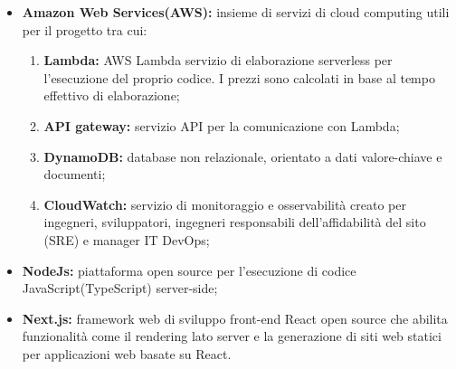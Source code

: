 \begin{itemize}
\item {\bf Amazon Web Services(AWS):} insieme di servizi di cloud computing utili per il progetto tra cui:
\begin{enumerate}
\item {\bf Lambda:} AWS Lambda servizio di elaborazione serverless per l'esecuzione del proprio codice. I prezzi sono calcolati in base al tempo effettivo di elaborazione;
\item {\bf API gateway:} servizio API per la comunicazione con Lambda;
\item {\bf DynamoDB:} database non relazionale, orientato a dati valore-chiave e documenti;
\item {\bf CloudWatch:} servizio di monitoraggio e osservabilità creato per ingegneri, sviluppatori, ingegneri responsabili dell'affidabilità del sito (SRE) e manager IT DevOps;
\end{enumerate}
\item {\bf NodeJs:} piattaforma open source per l'esecuzione di codice JavaScript(TypeScript) server-side;
\item {\bf Next.js:} framework web di sviluppo front-end React open source che abilita funzionalità come il rendering lato server e la generazione di siti web statici per applicazioni web basate su React. 
\end{itemize}